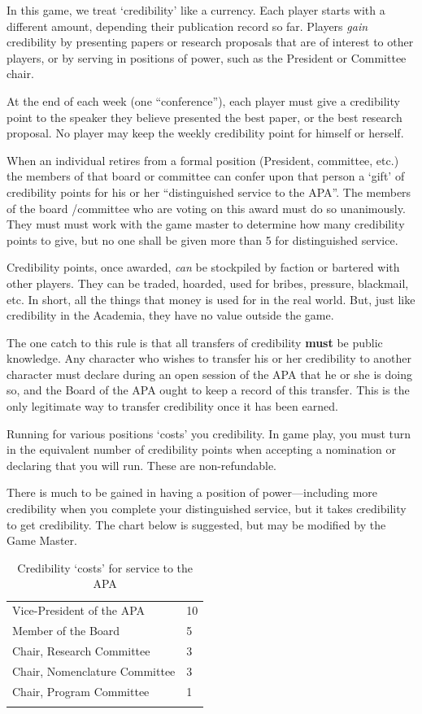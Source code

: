 \begin{refsection}
In this game, we treat ‘credibility’ like a currency. Each player starts with a different amount, depending their publication record so far. Players \emph{gain} credibility by presenting papers or research proposals that are of interest to other players, or by serving in positions of power, such as the President or Committee chair.

At the end of each week (one “conference”), each player must give a credibility point to the speaker they believe presented the best paper, or the best research proposal. No player may keep the weekly credibility point for himself or herself. 

When an individual retires from a formal position (President, committee, etc.) the members of that board or committee can confer upon that person a ‘gift’ of credibility points for his or her “distinguished service to the APA”. The members of the board \slash  committee who are voting on this award must do so unanimously. They must must work with the game master to determine how many credibility points to give, but no one shall be given more than 5 for distinguished service.

Credibility points, once awarded, \emph{can} be stockpiled by faction or bartered with other players. They can be traded, hoarded, used for bribes, pressure, blackmail, etc. In short, all the things that money is used for in the real world. But, just like credibility in the Academia, they have no value outside the game.

The one catch to this rule is that all transfers of credibility \textbf{must} be public knowledge. Any character who wishes to transfer his or her credibility to another character must declare during an open session of the APA that he or she is doing so, and the Board of the APA ought to keep a record of this transfer. This is the only legitimate way to transfer credibility once it has been earned.

Running for various positions ‘costs’ you credibility. In game play, you must turn in the equivalent number of credibility points when accepting a nomination or declaring that you will run. These are non-refundable.

There is much to be gained in having a position of power---including more credibility when you complete your distinguished service, but it takes credibility to get credibility. The chart below is suggested, but may be modified by the Game Master.

\begin{longtable}[!t]{ | P{7cm} | P{2cm}  | } \hline
{}& \\ \hline 
Vice-President of the APA& 10 \\ \hline
Member of the Board & 5 \\ \hline
Chair, Research Committee & 3 \\ \hline
Chair, Nomenclature Committee & 3 \\ \hline
Chair, Program Committee & 1 \\ \hline
\caption{Credibility ‘costs’ for service to the APA}
\label{table: credibilitymenu}  
\end{longtable} 


\end{refsection}
